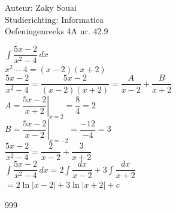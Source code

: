 \documentclass[a4paper]{article}
\begin{document}
  
\noindent \large Auteur: Zaky Souai \\
\noindent \large Studierichting:  Informatica\\
\noindent \large Oefeningenreeks 4A nr. 42.9\\

\bigskip

\normalsize

$\displaystyle \int \dfrac{5x-2}{x^2-4}\,dx$\\

$\displaystyle x^2-4=(x-2)(x+2)$\\

$\displaystyle \dfrac{5x-2}{x^2-4}=\dfrac{5x-2}{(x-2)(x+2)}=\dfrac{A}{x-2}+\dfrac{B}{x+2}$\\

$\displaystyle A=\left.\dfrac{5x-2}{x+2}\right|_{x=2}=\dfrac{8}{4}=2$\\

$\displaystyle B=\left.\dfrac{5x-2}{x-2}\right|_{x=-2}=\dfrac{-12}{-4}=3$\\

$\displaystyle \dfrac{5x-2}{x^2-4}=\dfrac{2}{x-2}+\dfrac{3}{x+2}$\\

$\displaystyle \int \dfrac{5x-2}{x^2-4}\,dx=2\int\dfrac{dx}{x-2}+3\int\dfrac{dx}{x+2}$\\

$\displaystyle =2\ln|x-2|+3\ln|x+2|+c$


\begin{thebibliography}{999}
\end{thebibliography}
\end{document}
